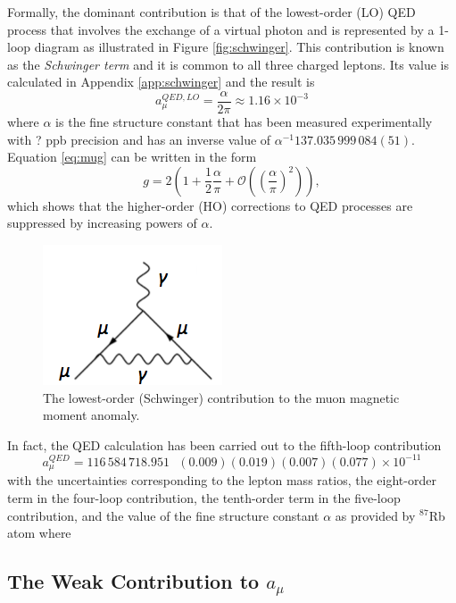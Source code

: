 \documentclass{outhesis}
\begin{document}
Formally, the dominant contribution is that of the lowest-order (LO) QED process that involves the exchange of a virtual photon and is represented by a 1-loop diagram as illustrated in Figure \ref{fig:schwinger}. This contribution is known as the \emph{Schwinger term} and it is common to all three charged leptons. Its value is calculated in Appendix \ref{app:schwinger} and the result is 
\begin{equation}
a_{\mu}^{QED,LO} = \frac{\alpha}{2\pi} \approx 1.16 \times 10^{-3}
\label{eq:schwinger}
\end{equation}
where $\alpha$ is the fine structure constant that has been measured experimentally with ? ppb precision and has an inverse value of $\alpha^{-1}137.035\,999\,084(51)$.
Equation \ref{eq:mug} can be written in the form
\begin{equation}
g = 2\left(1+\frac{1}{2}\frac{\alpha}{\pi}+ \mathcal{O}\left(\left(\frac{\alpha}{\pi}\right)^2\right)\right),
\label{eq:schwinger}
\end{equation}
which shows that the higher-order (HO) corrections to QED processes are suppressed by increasing powers of $\alpha$.  
\begin{figure}
  \centering
  \includegraphics[scale=0.5]{figures/schwinger}
   \caption{The lowest-order (Schwinger) contribution to the muon magnetic moment anomaly.}
\label{label:schwinger}
\end{figure}

In fact, the QED calculation has been carried out to the fifth-loop contribution
\begin{equation}
a_{\mu}^{QED} = 116\,584\,718.951 \,\,\,\, (0.009)(0.019)(0.007)(0.077) \times 10^{-11}
\end{equation} 
with the uncertainties corresponding to the lepton mass ratios, the eight-order term in the four-loop contribution, the tenth-order term in the five-loop contribution, and the value of the fine structure constant $\alpha$ as provided by $^{87}$Rb atom where 


\subsection{The Weak Contribution to $a_{\mu}$}
\end{document}
